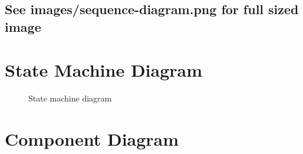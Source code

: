 \documentclass[
  english,
  a4paper,
,tablecaptionabove
]{scrartcl}
\begin{document}
\hypertarget{see-imagessequence-diagram.png-for-full-sized-image}{%
\subsection{See images/sequence-diagram.png for full sized
image}\label{see-imagessequence-diagram.png-for-full-sized-image}}

\newpage

\begin{landscape}

\pagestyle{empty}

\hypertarget{state-diagram}{%
\section{State Machine Diagram}\label{state-machine-diagram}}

\begin{figure}
    \caption{State machine diagram} \label{fig:state_machine_diagram}
\end{figure}

\end{landscape}

\newpage

\hypertarget{component-diagram}{%
\section{Component Diagram}\label{component-diagram}}
\end{document}
